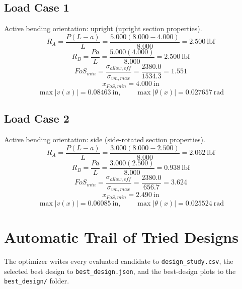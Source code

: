 \documentclass[11pt]{article}
\begin{document}
\subsection*{Load Case 1}
Active bending orientation: upright (upright section properties).
\[R_A = \frac{P(L-a)}{L} = \frac{5.000(8.000-4.000)}{8.000} = 2.500\ \mathrm{lbf}\]
\[R_B = \frac{Pa}{L} = \frac{5.000(4.000)}{8.000} = 2.500\ \mathrm{lbf}\]
\[FoS_{min} = \frac{\sigma_{allow,eff}}{\sigma_{vm,max}} = \frac{2380.0}{1534.3} = 1.551\]
\[x_{FoS,min} = 4.000\ \mathrm{in}\]
\[\max |v(x)| = 0.08463\ \mathrm{in}, \qquad \max |\theta(x)| = 0.027657\ \mathrm{rad}\]
\subsection*{Load Case 2}
Active bending orientation: side (side-rotated section properties).
\[R_A = \frac{P(L-a)}{L} = \frac{3.000(8.000-2.500)}{8.000} = 2.062\ \mathrm{lbf}\]
\[R_B = \frac{Pa}{L} = \frac{3.000(2.500)}{8.000} = 0.938\ \mathrm{lbf}\]
\[FoS_{min} = \frac{\sigma_{allow,eff}}{\sigma_{vm,max}} = \frac{2380.0}{656.7} = 3.624\]
\[x_{FoS,min} = 2.490\ \mathrm{in}\]
\[\max |v(x)| = 0.06085\ \mathrm{in}, \qquad \max |\theta(x)| = 0.025524\ \mathrm{rad}\]

\section*{Automatic Trail of Tried Designs}
The optimizer writes every evaluated candidate to \texttt{design\_study.csv}, the selected best design to \texttt{best\_design.json}, and the best-design plots to the \texttt{best\_design/} folder.
\end{document}
